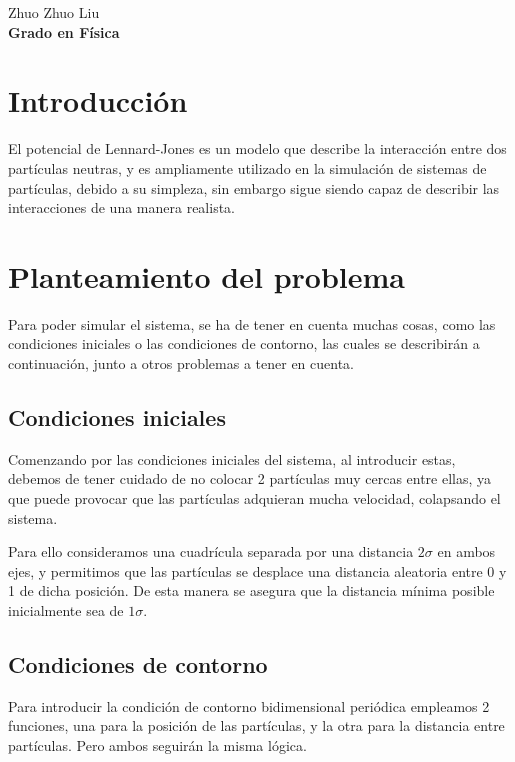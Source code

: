 \documentclass[11pt, twoside]{article} %
\begin{document}
\begin{flushright}
    \large Zhuo Zhuo Liu 
    \\
    \vspace{0.4cm}
    \textbf{Grado en Física}
\end{flushright}

\newpage

\setcounter{page}{0}
\tableofcontents
\newpage

\pagestyle{main}

\section{Introducción}

El potencial de Lennard-Jones es un modelo que describe la interacción entre dos
partículas neutras, y es ampliamente utilizado en la simulación de sistemas
de partículas, debido a su simpleza, sin embargo sigue siendo capaz de describir
las interacciones de una manera realista.

\section{Planteamiento del problema}

Para poder simular el sistema, se ha de tener en cuenta muchas cosas, como las 
condiciones iniciales o las condiciones de contorno, las cuales se describirán a 
continuación, junto a otros problemas a tener en cuenta.

\subsection{Condiciones iniciales}
Comenzando por las condiciones iniciales del sistema, al introducir estas, 
debemos de tener cuidado de no colocar 2 partículas muy cercas entre ellas, ya que 
puede provocar que las partículas adquieran mucha velocidad, colapsando el sistema.

Para ello consideramos una cuadrícula separada por una distancia $2\sigma$ en ambos 
ejes, y permitimos que las partículas se desplace una distancia aleatoria entre 0 y 1
de dicha posición. De esta manera se asegura que la distancia mínima posible inicialmente
sea de $1\sigma$. 
\subsection{Condiciones de contorno}

Para introducir la condición de contorno bidimensional periódica empleamos 
2 funciones, una para la posición de las partículas, y la otra para la 
distancia entre partículas. Pero ambos seguirán la misma lógica.
\end{document}
